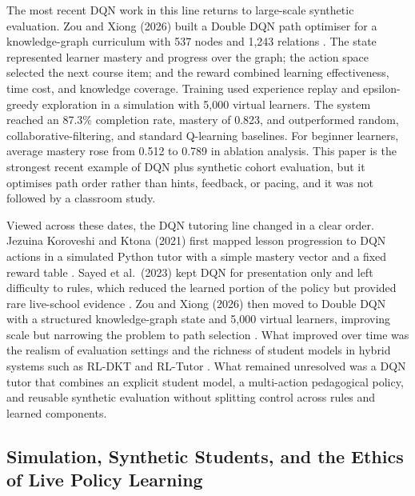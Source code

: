 The most recent \ac{DQN} work in this line returns to large-scale synthetic evaluation. Zou and Xiong (2026) built a Double \ac{DQN} path optimiser for a knowledge-graph curriculum with 537 nodes and 1{,}243 relations \cite{zou_deep_2026}. The state represented learner mastery and progress over the graph; the action space selected the next course item; and the reward combined learning effectiveness, time cost, and knowledge coverage. Training used experience replay and epsilon-greedy exploration in a simulation with 5{,}000 virtual learners. The system reached an 87.3\% completion rate, mastery of 0.823, and outperformed random, collaborative-filtering, and standard Q-learning baselines. For beginner learners, average mastery rose from 0.512 to 0.789 in ablation analysis. This paper is the strongest recent example of \ac{DQN} plus synthetic cohort evaluation, but it optimises path order rather than hints, feedback, or pacing, and it was not followed by a classroom study.

Viewed across these dates, the \ac{DQN} tutoring line changed in a clear order. Jezuina Koroveshi and Ktona (2021) first mapped lesson progression to \ac{DQN} actions in a simulated Python tutor with a simple mastery vector and a fixed reward table \cite{jezuina_koroveshi_training_2021}. Sayed et al.\ (2023) kept \ac{DQN} for presentation only and left difficulty to rules, which reduced the learned portion of the policy but provided rare live-school evidence \cite{sayed_ai-based_2023}. Zou and Xiong (2026) then moved to Double \ac{DQN} with a structured knowledge-graph state and 5{,}000 virtual learners, improving scale but narrowing the problem to path selection \cite{zou_deep_2026}. What improved over time was the realism of evaluation settings and the richness of student models in hybrid systems such as \ac{RL}-DKT and \ac{RL}-Tutor \cite{fu_integrating_2025,guzman_developing_2025}. What remained unresolved was a \ac{DQN} tutor that combines an explicit student model, a multi-action pedagogical policy, and reusable synthetic evaluation without splitting control across rules and learned components.

\subsection{Simulation, Synthetic Students, and the Ethics of Live Policy Learning}\label{subsec:synthetic_student_evaluation}

